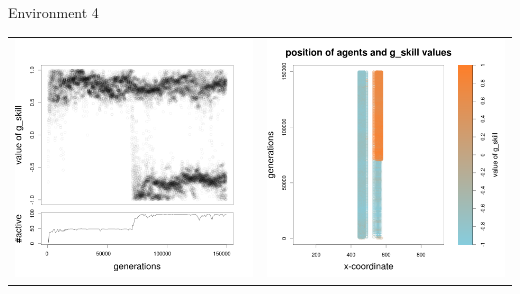 \documentclass[8pt, handout=show,notes=show]{beamer}
\begin{document}
\begin{frame}{Environment 4}
\begin{table}[H]
\begin{tabular}{cc}
\newline
\includegraphics[width=\imgSize]{../images/5StaticEnv/Gplot40_staticEnv4}&\includegraphics[width=\imgSize]{../images/5StaticEnv/Gplot40Static_staticEnv4}\\
\end{tabular}

\end{table}
\end{frame}
\end{document}
